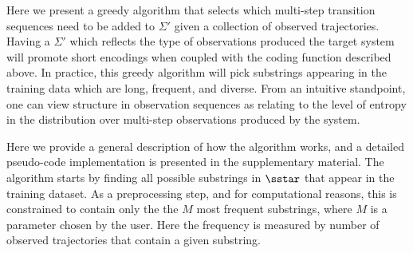 %
%
%
%
%

Here we present a greedy algorithm that selects which multi-step transition sequences need to be added to $\Sigma'$ given a collection of observed trajectories. Having a $\Sigma'$ which reflects the type of observations produced the target system will promote short encodings when coupled with the coding function described above. In practice, this greedy algorithm will pick substrings appearing in the training data which are long, frequent, and diverse. From an intuitive standpoint, one can view structure in observation sequences as relating to the level of entropy in the distribution over multi-step observations produced by the system. 

Here we provide a general description of how the algorithm works, and a detailed pseudo-code implementation is presented in the supplementary material. The algorithm starts by finding all possible substrings in $\sstar$ that appear in the training dataset. As a preprocessing step, and for computational reasons, this is constrained to contain only the the $M$ most frequent substrings, where $M$ is a parameter chosen by the user. Here the frequency is measured by number of observed trajectories that contain a given substring.

